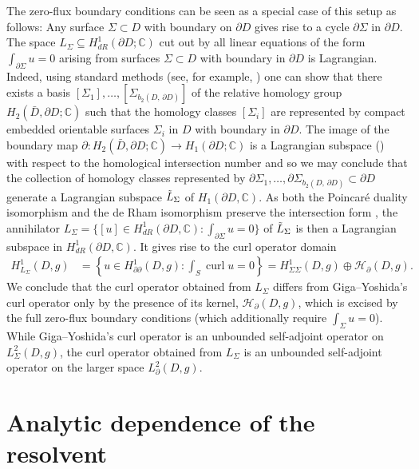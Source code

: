 \documentclass[11pt,reqno]{amsart}
\DeclareMathOperator{\curl}{curl}
\begin{document}
The zero-flux boundary conditions can be seen as a special case of this setup as follows: Any surface $\Sigma \subset D$ with boundary on $\partial D$ gives rise to a cycle $\partial \Sigma$ in $\partial D$. The space $L_\Sigma \subseteq H^1_{dR}(\partial D; \mathbb C)$ cut out by all linear equations of the form $\int_{\partial \Sigma} u = 0$ arising from surfaces $\Sigma\subset D$ with boundary in $\partial D$ is Lagrangian. Indeed, using standard methods (see, for example, \cite{Kotiuga1987}) one can show that there exists a basis $[\Sigma_1],\dots,[\Sigma_{b_2 (D,\,\partial D)}]$ of the relative homology group $H_2 (\bar D,\partial D; \mathbb C)$ such that the homology classes $[\Sigma_i]$ are represented by compact embedded orientable surfaces $\Sigma_i$ in $D$ with boundary in $\partial D$. The image of the boundary map $\partial: H_2 (\bar D,\partial D; \mathbb C) \to H_1 (\partial D; \mathbb C)$ is a Lagrangian subspace (\cite[Proposition 9.1.4.]{Martelli2016AnIT}) with respect to the homological intersection number and so we may conclude that the collection of homology classes represented by $\partial \Sigma_1,\dots,\partial\Sigma_{b_2 (D,\,\partial D)} \subset \partial D$ generate a Lagrangian subspace $\Tilde{L}_\Sigma$ of $H_1 (\partial D, \mathbb C)$. As both the Poincar\'e duality isomorphism and the de Rham isomorphism preserve the intersection form \cite[Theorem 5.45.]{Warner1983}, the annihilator $L_\Sigma = \{[u] \in H^1_{dR}(\partial D, \mathbb C): \int_{\partial \Sigma} u = 0 \}$ of $\Tilde{L}_\Sigma$ is then a Lagrangian subspace in $H^1_{dR}(\partial D,\mathbb C)$.
It gives rise to the curl operator domain
\begin{align*}
    H^1_{L_\Sigma}(D,g) &= \left\{u \in H^1_{\partial \partial}(D,g): \textstyle\int_S \curl u = 0 \right\} = H^1_{\Sigma\Sigma}(D,g) \oplus \mathcal H_\partial(D,g).
\end{align*}
We conclude that the curl operator obtained from $L_\Sigma$ differs from Giga--Yoshida's curl operator only by the presence of its kernel, $\mathcal H_\partial(D,g)$, which is excised by the full zero-flux boundary conditions (which additionally require $\int_\Sigma u = 0$). While Giga--Yoshida's curl operator is an unbounded self-adjoint operator on $L^2_\Sigma(D,g)$, the curl operator obtained from $L_\Sigma$ is an unbounded self-adjoint operator on the larger space $L^2_\partial(D,g)$.

\section{Analytic dependence of the resolvent}\label{section: analytic dependence of the resolvent}
\end{document}
